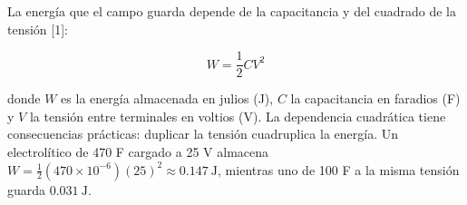 \documentclass[11pt,letterpaper]{article}
\begin{document}
La energía que el campo guarda depende de la capacitancia y del cuadrado de la tensión [1]:

\begin{equation}
  W = \frac{1}{2} C V^{2}
\end{equation}

donde $W$ es la energía almacenada en julios (J), $C$ la capacitancia en faradios (F) y $V$ la tensión entre terminales en voltios (V). La dependencia cuadrática tiene consecuencias prácticas: duplicar la tensión cuadruplica la energía. Un electrolítico de 470 \textmu{}F cargado a 25 V almacena $W = \tfrac{1}{2}(470 \times 10^{-6})(25)^2 \approx 0.147\ \text{J}$, mientras uno de 100 \textmu{}F a la misma tensión guarda $0.031\ \text{J}$.

\end{document}
